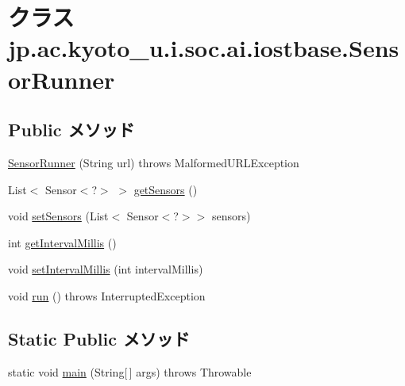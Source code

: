 \hypertarget{classjp_1_1ac_1_1kyoto__u_1_1i_1_1soc_1_1ai_1_1iostbase_1_1_sensor_runner}{\section{クラス jp.\-ac.\-kyoto\-\_\-u.\-i.\-soc.\-ai.\-iostbase.\-Sensor\-Runner}
\label{classjp_1_1ac_1_1kyoto__u_1_1i_1_1soc_1_1ai_1_1iostbase_1_1_sensor_runner}
}
\subsection*{Public メソッド}
\begin{DoxyCompactItemize}
\item 
\hyperlink{classjp_1_1ac_1_1kyoto__u_1_1i_1_1soc_1_1ai_1_1iostbase_1_1_sensor_runner_af326f1a7ab525fb2874bb2c22faafde2}{Sensor\-Runner} (String url)  throws Malformed\-U\-R\-L\-Exception 
\item 
List$<$ Sensor$<$?$>$ $>$ \hyperlink{classjp_1_1ac_1_1kyoto__u_1_1i_1_1soc_1_1ai_1_1iostbase_1_1_sensor_runner_a67d6a5d387438ea868cd821cd851b80f}{get\-Sensors} ()
\item 
void \hyperlink{classjp_1_1ac_1_1kyoto__u_1_1i_1_1soc_1_1ai_1_1iostbase_1_1_sensor_runner_ae6a7020f02f06fd83b2a1d6081ac687e}{set\-Sensors} (List$<$ Sensor$<$?$>$$>$ sensors)
\item 
int \hyperlink{classjp_1_1ac_1_1kyoto__u_1_1i_1_1soc_1_1ai_1_1iostbase_1_1_sensor_runner_a8355ed1ad8c26fb5fb878a2480038b82}{get\-Interval\-Millis} ()
\item 
void \hyperlink{classjp_1_1ac_1_1kyoto__u_1_1i_1_1soc_1_1ai_1_1iostbase_1_1_sensor_runner_aa955dcc8eae7e03a94849fefd1db5930}{set\-Interval\-Millis} (int interval\-Millis)
\item 
void \hyperlink{classjp_1_1ac_1_1kyoto__u_1_1i_1_1soc_1_1ai_1_1iostbase_1_1_sensor_runner_ae24b5ec53f176390bdac0951a8bb230f}{run} ()  throws Interrupted\-Exception 
\end{DoxyCompactItemize}
\subsection*{Static Public メソッド}
\begin{DoxyCompactItemize}
\item 
static void \hyperlink{classjp_1_1ac_1_1kyoto__u_1_1i_1_1soc_1_1ai_1_1iostbase_1_1_sensor_runner_a18c6d84e04f16cc5433b9d356dbf684f}{main} (String\mbox{[}$\,$\mbox{]} args)  throws Throwable
\end{DoxyCompactItemize}


